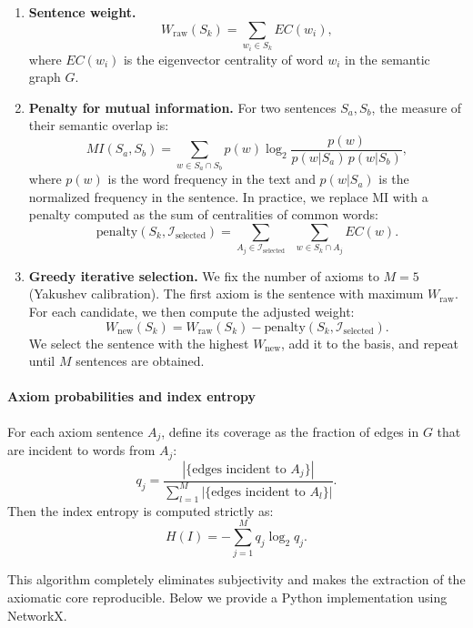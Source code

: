 \documentclass[12pt,a4paper]{article}
\begin{document}
	\begin{enumerate}
		\item \textbf{Sentence weight.}
		\[
		W_{\text{raw}}(S_k) = \sum_{w_i \in S_k} EC(w_i),
		\]
		where \(EC(w_i)\) is the eigenvector centrality of word \(w_i\) in the semantic graph \(G\).
		
		\item \textbf{Penalty for mutual information.}
		For two sentences \(S_a, S_b\), the measure of their semantic overlap is:
		\[
		MI(S_a, S_b) = \sum_{w \in S_a \cap S_b} p(w) \log_2 \frac{p(w)}{p(w|S_a)\, p(w|S_b)},
		\]
		where \(p(w)\) is the word frequency in the text and \(p(w|S_a)\) is the normalized frequency in the sentence. In practice, we replace MI with a penalty computed as the sum of centralities of common words:
		\[
		\text{penalty}(S_k, \mathcal{I}_{\text{selected}}) = \sum_{A_j \in \mathcal{I}_{\text{selected}}} \;\; \sum_{w \in S_k \cap A_j} EC(w).
		\]
		
		\item \textbf{Greedy iterative selection.}
		We fix the number of axioms to \(M = 5\) (Yakushev calibration). The first axiom is the sentence with maximum \(W_{\text{raw}}\). For each candidate, we then compute the adjusted weight:
		\[
		W_{\text{new}}(S_k) = W_{\text{raw}}(S_k) - \text{penalty}(S_k, \mathcal{I}_{\text{selected}}).
		\]
		We select the sentence with the highest \(W_{\text{new}}\), add it to the basis, and repeat until \(M\) sentences are obtained.
	\end{enumerate}
	
	\paragraph{Axiom probabilities and index entropy}
	For each axiom sentence \(A_j\), define its coverage as the fraction of edges in \(G\) that are incident to words from \(A_j\):
	\[
	q_j = \frac{|\{\text{edges incident to } A_j\}|}{\sum_{l=1}^M |\{\text{edges incident to } A_l\}|}.
	\]
	Then the index entropy is computed strictly as:
	\[
	H(I) = -\sum_{j=1}^{M} q_j \log_2 q_j.
	\]
	
	This algorithm completely eliminates subjectivity and makes the extraction of the axiomatic core reproducible. Below we provide a Python implementation using NetworkX.
	
\end{document}
